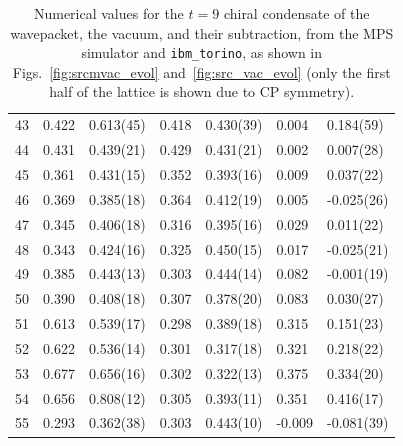 \documentclass[aps, prc, tightenlines,superscriptaddress, letterpaper, amsmath, amssymb, preprintnumbers, floatfix, longbibliography, nofootinbib]{revtex4-2}
\begin{document}
\begin{table}[!htb]
{\begin{tabularx}{\textwidth}{| c || Y | Y | Y | Y | Y | Y |}
43	&	0.422	&	0.613(45)	&	0.418	&	0.430(39)	&	0.004	&	0.184(59)	\\
44	&	0.431	&	0.439(21)	&	0.429	&	0.431(21)	&	0.002	&	0.007(28)	\\
45	&	0.361	&	0.431(15)	&	0.352	&	0.393(16)	&	0.009	&	0.037(22)	\\
46	&	0.369	&	0.385(18)	&	0.364	&	0.412(19)	&	0.005	&	-0.025(26)	\\
47	&	0.345	&	0.406(18)	&	0.316	&	0.395(16)	&	0.029	&	0.011(22)	\\
48	&	0.343	&	0.424(16)	&	0.325	&	0.450(15)	&	0.017	&	-0.025(21)	\\
49	&	0.385	&	0.443(13)	&	0.303	&	0.444(14)	&	0.082	&	-0.001(19)	\\
50	&	0.390	&	0.408(18)	&	0.307	&	0.378(20)	&	0.083	&	0.030(27)	\\
51	&	0.613	&	0.539(17)	&	0.298	&	0.389(18)	&	0.315	&	0.151(23)	\\
52	&	0.622	&	0.536(14)	&	0.301	&	0.317(18)	&	0.321	&	0.218(22)	\\
53	&	0.677	&	0.656(16)	&	0.302	&	0.322(13)	&	0.375	&	0.334(20)	\\
54	&	0.656	&	0.808(12)	&	0.305	&	0.393(11)	&	0.351	&	0.416(17)	\\
55	&	0.293	&	0.362(38)	&	0.303	&	0.443(10)	&	-0.009	&	-0.081(39)	\\ \hline
\end{tabularx}}
\caption{Numerical values for the $t=9$ chiral condensate of the wavepacket, the vacuum, and their subtraction, from the MPS simulator and {\tt ibm\_torino}, as shown in Figs.~\ref{fig:srcmvac_evol} and~\ref{fig:src_vac_evol} (only the first half of the lattice is shown due to CP symmetry).}
 \label{tab:tablet9}
\end{table}
%
\end{document}
